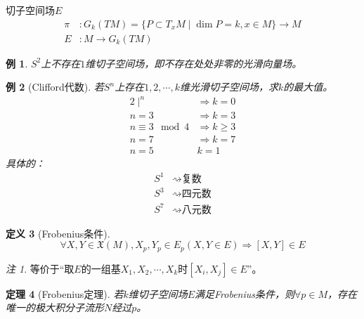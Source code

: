 \documentclass[winfonts,UTF8,c5size,a4paper,fancyhdr,hyperref,titlepage,nocap]{ctexart}
\newtheorem{thm}{定理}
\newtheorem{exa}[thm]{例}
\theoremstyle{definition}
\newtheorem{defn}[thm]{定义}
\theoremstyle{remark}
\newtheorem*{rem}{注}
\numberwithin{equation}{subsection}
\newcommand{\Xf}[1]{\mathfrak{X}(#1)}
\begin{document}
切子空间场$E$
\begin{align*}
\pi&\colon G_k(TM)=\{P\subset T_xM\mid\dim P=k,x\in M\}\longrightarrow M\\
E&\colon M\longrightarrow G_k(TM)
\end{align*}
\begin{exa}
  $S^2$上不存在$1$维切子空间场，即不存在处处非零的光滑向量场。
\end{exa}
\begin{exa}[Clifford代数]
若$S^n$上存在$1,2,\cdots,k$维光滑切子空间场，求$k$的最大值。
\begin{align*}
2\mid^n&\Longrightarrow k=0\\
n=3&\Longrightarrow k=3\\
n\equiv3\mod4&\Longrightarrow  k\geqslant3\\
n=7&\Longrightarrow k=7\\
n=5& k=1
\end{align*}
具体的：
\begin{align*}
S^1&\rightsquigarrow \text{复数}\\
S^3&\rightsquigarrow \text{四元数}\\
S^7&\rightsquigarrow \text{八元数}
\end{align*}
\end{exa}
\begin{defn}[Frobenius条件]
\begin{equation*}
\forall X,Y\in\Xf{M}, X_p,Y_p\in E_p(X,Y\in E)\Longrightarrow[X,Y]\in E
\end{equation*}
\end{defn}
\begin{rem}
  等价于“取$E$的一组基$X_1,X_2,\cdots,X_k$时$[X_i,X_j]\in E$”。
\end{rem}
\begin{thm}[Frobenius定理]
若$k$维切子空间场$E$满足Frobenius条件，则$\forall p\in M$，存在唯一的极大积分子流形$N$经过$p$。
\end{thm}
\end{document}

